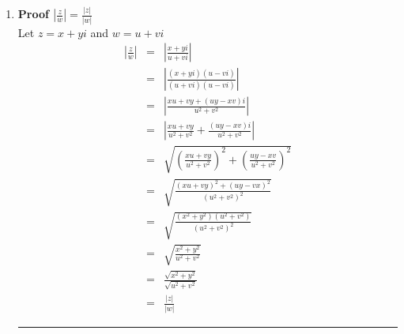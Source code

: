 \documentclass{article}%
\newcommand\abs[1]{\left|#1\right|}
\newenvironment{proof}[1][]{\begin{samepage}\textbf{Proof #1} }{\rule{0.5em}{0.5em} \end{samepage}}
\begin{document}
\begin{enumerate}
\begin{enumerate}[label*=\arabic*.]
\begin{enumerate}[label=\alph*]
\begin{proof}[$\overline{\frac{z}{w}}=\frac{\bar{z}}{\bar{w}}$]
\begin{eqnarray*}
                                            &=&\overline{(\frac{xu+yv+(uy-xv)i}{u^2+v^2})} \\
                                            &=&\frac{xu+yv-(uy-xv)i}{u^2+v^2} \\
                    \frac{\bar{z}}{\bar{w}}&=&\frac{\overline{x+yi}}{\overline{u+vi}} \\
                                           &=&\frac{x-yi}{u-vi} \\
                                           &=&\frac{(x-yi)(u+vi)}{(u-vi)(u+vi)} \\
                                           &=&\frac{xu+yv-(uy-xv)i}{u^2+v^2} \\ 
                    \overline{(\frac{z}{w})}&=&\frac{\bar{z}}{\bar{w}}
                \end{eqnarray*}
            \end{proof}
            \item %
            \begin{proof}[$\abs{\frac{z}{w}}=\frac{\abs{z}}{\abs{w}}$]
                \\ Let $z=x+yi$ and $w=u+vi$
                \begin{eqnarray*}
                    \abs{\frac{z}{w}}&=&\abs{\frac{x+yi}{u+vi}} \\
                                     &=&\abs{\frac{(x+yi)(u-vi)}{(u+vi)(u-vi)}} \\
                                     &=&\abs{\frac{xu+vy+(uy-xv)i}{u^2+v^2}} \\
                                     &=&\abs{\frac{xu+vy}{u^2+v^2}+\frac{(uy-xv)i}{u^2+v^2}} \\
                                     &=&\sqrt{(\frac{xu+vy}{u^2+v^2})^2 + (\frac{uy-xv}{u^2+v^2})^2 } \\
                                     &=&\sqrt{\frac{(xu+vy)^2+(uy-vx)^2}{(u^2+v^2)^2}} \\
                                     &=&\sqrt{\frac{(x^2+y^2)(u^2+v^2)}{(u^2+v^2)^2}} \\
                                     &=&\sqrt{\frac{x^2+y^2}{u^2+v^2}} \\
                                     &=&\frac{\sqrt{x^2+y^2}}{\sqrt{u^2+v^2}} \\
                                     &=&\frac{\abs{z}}{\abs{w}}
                \end{eqnarray*}
            \end{proof}

\end{enumerate}
\end{enumerate}
\end{enumerate}
\end{document}
